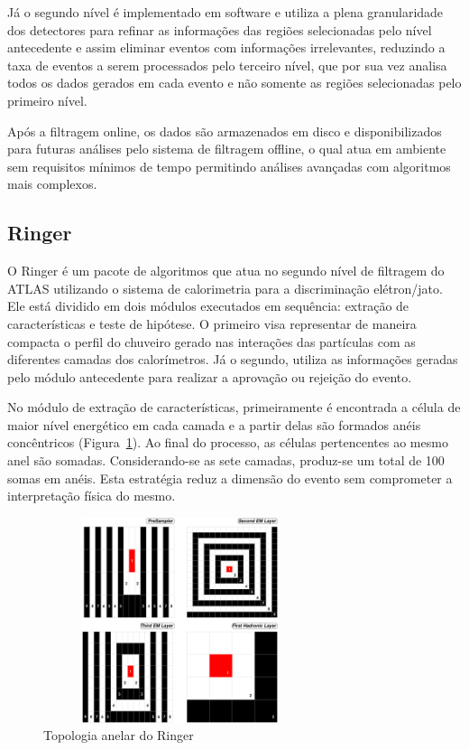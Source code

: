 \documentclass[a4paper,10pt,titlepage]{article}
\begin{document}
Já o segundo nível é implementado em software e utiliza a plena granularidade dos detectores para refinar as informações das regiões selecionadas pelo nível antecedente e assim eliminar eventos com informações irrelevantes, reduzindo a taxa de eventos a serem processados pelo terceiro nível, que por sua vez analisa todos os dados gerados em cada evento e não somente as regiões selecionadas pelo primeiro nível.

Após a filtragem online, os dados são armazenados em disco e disponibilizados para futuras análises pelo sistema de filtragem offline, o qual atua em ambiente sem requisitos mínimos de tempo permitindo análises avançadas com algoritmos mais complexos.

\subsection{Ringer}

O Ringer é um pacote de algoritmos que atua no segundo nível de filtragem do ATLAS utilizando o sistema de calorimetria para a discriminação elétron/jato.
Ele está dividido em dois módulos executados em sequência: extração de características e teste de hipótese.
O primeiro visa representar de maneira compacta o perfil do chuveiro gerado nas interações das partículas com as diferentes camadas dos calorímetros. 
Já o segundo, utiliza as informações geradas pelo módulo antecedente para realizar a aprovação ou rejeição do evento.

No módulo de extração de características, primeiramente é encontrada a célula de maior nível energético em cada camada e a partir delas são formados anéis concêntricos (Figura~\ref{fig:rings}).
Ao final do processo, as células pertencentes ao mesmo anel são somadas.
Considerando-se as sete camadas, produz-se um total de 100 somas em anéis.
Esta estratégia reduz a dimensão do evento sem comprometer a interpretação física do mesmo.

\begin{figure}[htbp!]
 \centering
 \includegraphics[width=8cm,height=6cm]{Figs/atlas/rings.pdf}
 \caption{Topologia anelar do Ringer}
 \label{fig:rings}
\end{figure}
\end{document}
